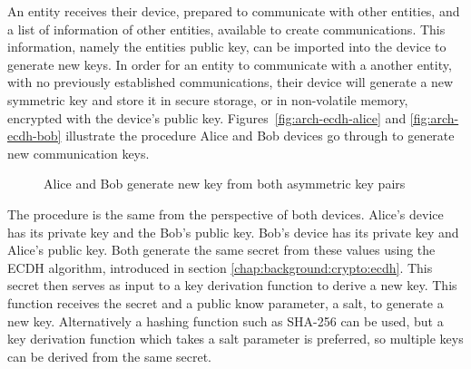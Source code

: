 An entity receives their device, prepared to communicate with other entities, and a list of information of other entities, available to create communications. This information, namely the entities public key, can be imported into the device to generate new keys.
In order for an entity to communicate with a another entity, with no previously established communications, their device will generate a new symmetric key and store it in secure storage, or in non-volatile memory, encrypted with the device's public key.
Figures~\ref{fig:arch-ecdh-alice} and \ref{fig:arch-ecdh-bob} illustrate the procedure Alice and Bob devices go through to generate new communication keys.

\begin{figure}[h!]
	\centering     %
	\caption{Alice and Bob generate new key from both asymmetric key pairs}
\end{figure}

The procedure is the same from the perspective of both devices. Alice's device has its private key and the Bob's public key. Bob's device has its private key and Alice's public key. Both generate the same secret from these values using the \ac{ECDH} algorithm, introduced in section \ref{chap:background:crypto:ecdh}.
This secret then serves as input to a key derivation function to derive a new key. This function receives the secret and a public know parameter, a salt, to generate a new key. Alternatively a hashing function such as SHA-256 can be used, but a key derivation function which takes a salt parameter is preferred, so multiple keys can be derived from the same secret.

